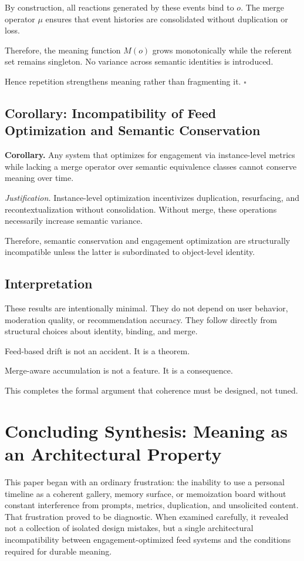 \documentclass[11pt,oneside]{article}
\begin{document}
By construction, all reactions generated by these events bind to $o$. The merge operator $\mu$ ensures that event histories are consolidated without duplication or loss.

Therefore, the meaning function $M(o)$ grows monotonically while the referent set remains singleton. No variance across semantic identities is introduced.

Hence repetition strengthens meaning rather than fragmenting it. \hfill $\square$

\subsection{Corollary: Incompatibility of Feed Optimization and Semantic Conservation}

\textbf{Corollary.}  
Any system that optimizes for engagement via instance-level metrics while lacking a merge operator over semantic equivalence classes cannot conserve meaning over time.

\emph{Justification.}  
Instance-level optimization incentivizes duplication, resurfacing, and recontextualization without consolidation. Without merge, these operations necessarily increase semantic variance.

Therefore, semantic conservation and engagement optimization are structurally incompatible unless the latter is subordinated to object-level identity.

\subsection{Interpretation}

These results are intentionally minimal. They do not depend on user behavior, moderation quality, or recommendation accuracy. They follow directly from structural choices about identity, binding, and merge.

Feed-based drift is not an accident. It is a theorem.

Merge-aware accumulation is not a feature. It is a consequence.

This completes the formal argument that coherence must be designed, not tuned.

\section{Concluding Synthesis: Meaning as an Architectural Property}

This paper began with an ordinary frustration: the inability to use a personal timeline as a coherent gallery, memory surface, or memoization board without constant interference from prompts, metrics, duplication, and unsolicited content. That frustration proved to be diagnostic. When examined carefully, it revealed not a collection of isolated design mistakes, but a single architectural incompatibility between engagement-optimized feed systems and the conditions required for durable meaning.
\end{document}
